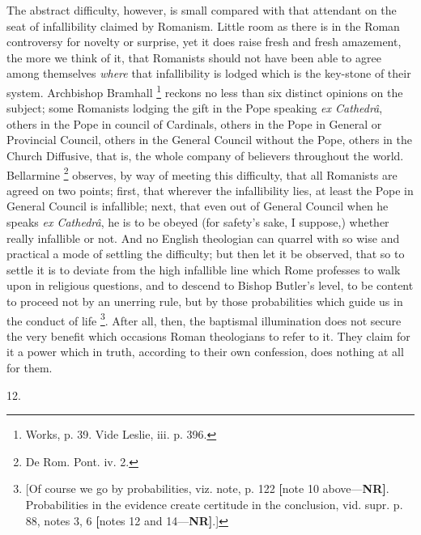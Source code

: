The abstract difficulty, however, is small compared with that
attendant on the seat of infallibility claimed by Romanism. Little
room as there is in the Roman controversy for novelty or surprise, yet
it does raise fresh and fresh amazement, the more we think of
it, that Romanists should not have been able to agree among themselves
\emph{where} that infallibility is lodged which is the key-stone of
their system. Archbishop Bramhall \footnote{Works, p. 39. Vide Leslie, iii. p. 396.} reckons no less than six distinct opinions on the subject;
some Romanists lodging the gift in the Pope speaking \emph{ex Cathedrâ},
others in the Pope in council of Cardinals, others in the Pope in
General or Provincial Council, others in the General Council without
the Pope, others in the Church Diffusive, that is, the whole company
of believers throughout the world. Bellarmine \footnote{De Rom. Pont. iv. 2.} observes, by way of meeting this difficulty, that all
Romanists are agreed on two points; first, that wherever the
infallibility lies, at least the Pope in General Council is
infallible; next, that even out of General Council when he speaks \emph{ex
Cathedrâ}, he is to be obeyed (for safety's sake, I suppose,)
whether really infallible or not. And no English theologian can
quarrel with so wise and practical a mode of settling the difficulty;
but then let it be observed, that so to settle it is to deviate from
the high infallible line which Rome professes to walk upon in
religious questions, and to descend to Bishop Butler's level, to be
content to proceed not by an unerring rule, but by those probabilities
which guide us in the conduct of life \footnote{[Of course we go by probabilities, viz.
note, p. 122 \textbf{[}note 10 above—\textbf{NR}\textbf{]}.
Probabilities in the evidence create certitude in the
conclusion, vid. supr. p. 88, notes 3, 6 \textbf{[}notes
12 and 14—\textbf{NR}\textbf{]}.]}. After all, then, the baptismal illumination does not secure
the very benefit which occasions Roman theologians to refer to it.
They claim for it a power which in truth, according to their own
confession, does nothing at all for them.

12.

